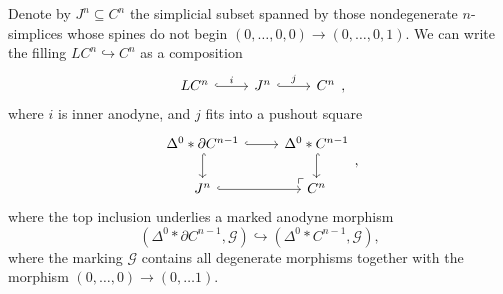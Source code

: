 \documentclass[main.tex]{subfiles}
\begin{document}
\begin{proposition}
  \label{prop:cube_filling}
  Denote by $J^{n} \subseteq C^{n}$ the simplicial subset spanned by those nondegenerate $n$-simplices whose spines do not begin $(0, \ldots, 0, 0) \to (0, \ldots, 0, 1)$. We can write the filling $LC^{n} \hookrightarrow C^{n}$ as a composition
  \begin{equation*}
    \begin{tikzcd}
      LC^{n}
      \arrow[r, hook, "i"]
      & J^{n}
      \arrow[r, hook, "j"]
      & C^{n}
    \end{tikzcd},
  \end{equation*}
  where $i$ is inner anodyne, and $j$ fits into a pushout square
  \begin{equation*}
    \begin{tikzcd}
      \Delta^{0} \ast \partial C^{n-1}
      \arrow[dr, phantom, "\ulcorner"{at end}]
      \arrow[r, hook]
      \arrow[d, hook]
      & \Delta^{0} \ast C^{n-1}
      \arrow[d, hook]
      \\
      J^{n}
      \arrow[r, hook]
      & C^{n}
    \end{tikzcd},
  \end{equation*}
  where the top inclusion underlies a marked anodyne morphism
  \begin{equation*}
    (\Delta^{0} \ast \partial C^{n-1}, \mathcal{G}) \hookrightarrow (\Delta^{0} \ast C^{n-1}, \mathcal{G}),
  \end{equation*}
  where the marking $\mathcal{G}$ contains all degenerate morphisms together with the morphism $(0, \ldots, 0) \to (0, \ldots 1)$.

\end{proposition}
\end{document}
